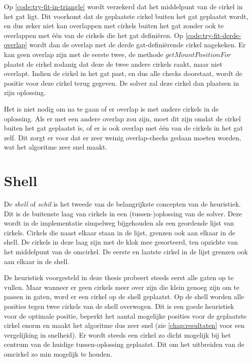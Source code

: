 \documentclass[12pt,a4paper,oneside]{book}
\begin{document}
Op \autoref{code:try-fit-in-triangle} wordt verzekerd dat het middelpunt van de cirkel in het gat ligt.
Dit voorkomt dat de geplaatste cirkel buiten het gat geplaatst wordt, en dus zeker niet kan overlappen met cirkels buiten het gat zonder ook te overlappen met één van de cirkels die het gat definiëren.
Op \autoref{code:try-fit-derde-overlap} wordt dan de overlap met de derde gat-definiërende cirkel nagekeken.
Er kan geen overlap zijn met de eerste twee, de methode $getMountPositionFor$ plaatst de cirkel zodanig dat deze de twee andere cirkels raakt, maar niet overlapt.
Indien de cirkel in het gat past, en dus alle checks doorstaat, wordt de positie voor deze cirkel terug gegeven.
De solver zal deze cirkel dan plaatsen in zijn oplossing.

Het is niet nodig om na te gaan of er overlap is met andere cirkels in de oplossing.
Als er met een andere overlap zou zijn, moet dit zijn omdat de cirkel buiten het gat geplaatst is, of er is ook overlap met één van de cirkels in het gat zelf.
Dit zorgt er voor dat er zeer weinig overlap-checks gedaan moeten worden, wat het algoritme zeer snel maakt.

\section{Shell} \label{sec:shell}

De \textit{shell} of \textit{schil} is het tweede van de belangrijkste concepten van de heuristiek.
Dit is de buitenste laag van cirkels in een (tussen-)oplossing van de solver.
Deze wordt in de implementatie simpelweg bijgehouden als een geordende lijst van cirkels.
Cirkels die naast elkaar staan in de lijst, grenzen ook aan elkaar in de shell.
De cirkels in deze laag zijn met de klok mee gesorteerd, ten opzichte van het middelpunt van de omcirkel.
De eerste en laatste cirkel in de lijst grenzen ook aan elkaar in de shell.

De heuristiek voorgesteld in deze thesis probeert steeds eerst alle gaten op te vullen.
Maar wanneer er geen cirkels meer over zijn die klein genoeg zijn om te passen in gaten, word er een cirkel op de shell geplaatst.
Op de shell worden alle posities tegen twee cirkels van de shell overwogen.
Dit is een goede heuristiek voor de optimale positie, beperkt het aantal mogelijke posities voor de geplaatste cirkel enorm en maakt het algoritme dus zeer snel (zie \autoref{chap:resultaten} voor een vergelijking in snelheid).
Er wordt steeds een cirkel zo dicht mogelijk bij het centrum van de huidige tussen-oplossing geplaatst.
Dit om het uitbreiden van de omcirkel zo min mogelijk te houden.
\end{document}
